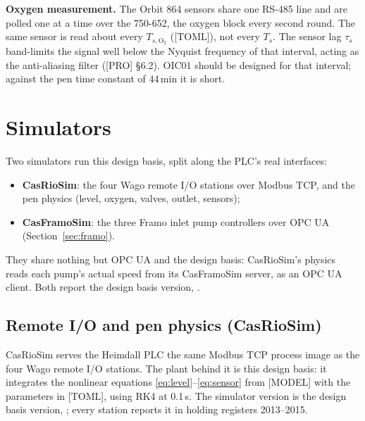 \documentclass[11pt]{article}
\begin{document}
\textbf{Oxygen measurement.} The Orbit 864 sensors share one RS-485 line and are polled one at a
time over the 750-652, the oxygen block every second round. The same sensor is read about every
$T_{s,\text{O}_2}$ ([TOML]), not every $T_s$. The sensor lag $\tau_s$ band-limits the signal
well below the Nyquist frequency of that interval, acting as the anti-aliasing filter
([PRO] §6.2). OIC01 should be designed for that interval; against the pen time constant of
44\,min it is short.

\section{Simulators}\label{sec:sim}

Two simulators run this design basis, split along the PLC's real interfaces:
\begin{itemize}
  \item \textbf{CasRioSim}: the four Wago remote I/O stations over Modbus TCP, and the pen
        physics (level, oxygen, valves, outlet, sensors);
  \item \textbf{CasFramoSim}: the three Framo inlet pump controllers over OPC UA
        (Section~\ref{sec:framo}).
\end{itemize}
They share nothing but OPC UA and the design basis: CasRioSim's physics reads each pump's
actual speed from its CasFramoSim server, as an OPC UA client. Both report the design basis
version, \CASVersion.

\subsection{Remote I/O and pen physics (CasRioSim)}

CasRioSim serves the Heimdall PLC the same Modbus TCP process image as the four Wago remote I/O
stations. The plant behind it is this design basis: it integrates the nonlinear equations
\eqref{eq:level}--\eqref{eq:sensor} from [MODEL] with the parameters in [TOML], using RK4 at
0.1\,s. The simulator version is the design basis version, \CASVersion; every station reports
it in holding registers 2013--2015.
\end{document}
